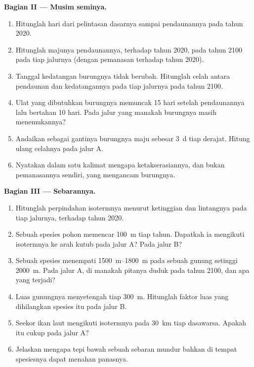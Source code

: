 \begin{problem}
\medskip
\noindent\textbf{Bagian II --- Musim seminya.}
\begin{enumerate}[resume]
  \item Hitunglah hari dari pelintasan dasarnya sampai pendaunannya
        pada tahun 2020.
  \item Hitunglah majunya pendaunannya, terhadap tahun 2020, pada
        tahun 2100 pada tiap jalurnya (dengan pemanasan terhadap tahun
        2020).
  \item Tanggal kedatangan burungnya tidak berubah. Hitunglah celah
        antara pendaunan dan kedatangannya pada tiap jalurnya pada
        tahun 2100.
  \item Ulat yang dibutuhkan burungnya memuncak 15 hari setelah
        pendaunannya lalu bertahan 10 hari. Pada jalur yang manakah
        burungnya masih menemukannya?
  \item Andaikan sebagai gantinya burungnya maju sebesar \qty{3}{d}
        tiap derajat. Hitung ulang celahnya pada jalur A.
  \item Nyatakan dalam satu kalimat mengapa ketakserasiannya, dan
        bukan pemanasannya sendiri, yang mengancam burungnya.
\end{enumerate}

\medskip
\noindent\textbf{Bagian III --- Sebarannya.}
\begin{enumerate}[resume]
  \item Hitunglah perpindahan isotermnya menurut ketinggian dan
        lintangnya pada tiap jalurnya, terhadap tahun 2020.
  \item Sebuah spesies pohon memencar \qty{100}{m} tiap tahun.
        Dapatkah ia mengikuti isotermnya ke arah kutub pada jalur A?
        Pada jalur B?
  \item Sebuah spesies menempati \qtyrange{1500}{1800}{m} pada sebuah
        gunung setinggi \qty{2000}{m}. Pada jalur A, di manakah pitanya
        duduk pada tahun 2100, dan apa yang terjadi?
  \item Luas gunungnya menyetengah tiap \qty{300}{m}. Hitunglah faktor
        luas yang dihilangkan spesies itu pada jalur B.
  \item Seekor ikan laut mengikuti isotermnya pada \qty{30}{km} tiap
        dasawarsa. Apakah itu cukup pada jalur A?
  \item Jelaskan mengapa tepi bawah sebuah sebaran mundur bahkan di
        tempat spesiesnya dapat menahan panasnya.
\end{enumerate}


\end{problem}
